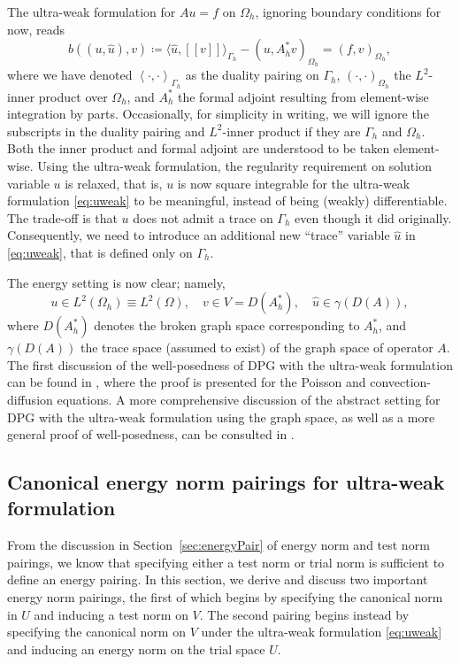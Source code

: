 \documentclass[11pt,onecolumn]{scrartcl}
\newcommand{\eqnlab}[1]{\label{eq:#1}}
\newcommand{\eqnref}[1]{\eqref{eq:#1}}
\newcommand{\secref}[1]{\ref{sec:#1}}
\newcommand{\LRp}[1]{\left( #1 \right)}
\newcommand{\LRs}[1]{\left[ #1 \right]}
\newcommand{\LRa}[1]{\left\langle #1 \right\rangle}
\newcommand{\jump}[1] {\ensuremath{\LRs{\![#1]\!}}}
\newcommand{\Gh}{\Gamma_h}
\newcommand{\Oh}{\Omega_h}
\begin{document}
The ultra-weak formulation for $Au = f$ on $\Oh$, ignoring boundary
conditions for now, reads
\begin{equation}
\eqnlab{uweak}
b\left(\left(u, \widehat{u}\right),v\right) \coloneqq \langle \widehat{u}, \jump{v}
\rangle_{\Gh} - (u,A_h^*v)_{\Oh}= \LRp{f,v}_{\Oh},
\end{equation}
where we have denoted $\LRa{\cdot,\cdot}_{\Gh}$ as the duality
pairing on $\Gh$, $\LRp{\cdot,\cdot}_{\Oh}$ the $L^2$-inner
product over $\Oh$, and $A_h^*$ the formal adjoint resulting from
element-wise integration by parts.  Occasionally, for simplicity in
writing, we will ignore the subscripts in the duality pairing and
$L^2$-inner product if they are $\Gh$ and $\Oh$. Both the
inner product and formal adjoint are understood to be taken
element-wise. Using the ultra-weak formulation, the regularity
requirement on solution variable $u$ is relaxed, that is, $u$ is now
square integrable for the ultra-weak formulation \eqnref{uweak} to be
meaningful, instead of being (weakly) differentiable.  The trade-off
is that $u$ does not admit a trace on $\Gh$ even though it did
originally. Consequently, we need to introduce an additional new
``trace'' variable $\widehat{u}$ in \eqnref{uweak}, that is defined only on
$\Gh$.

The energy setting is now clear; namely,
\[
u\in L^2\LRp{\Oh} \equiv L^2(\Omega), \quad v\in V=D(A^*_h), \quad
\widehat{u}\in \gamma(D(A)),
\]
where $D(A_h^*)$ denotes the broken graph space corresponding to $A_h^*$,
and $\gamma(D(A))$ the trace space (assumed to exist) of the graph space of
operator $A$. The first discussion of the well-posedness of DPG with the ultra-weak formulation can be found in \cite{analysisDPG}, where the proof is presented for the Poisson and convection-diffusion equations. A more comprehensive discussion of the abstract setting for DPG with the ultra-weak formulation using the graph space, as well as a more general proof of well-posedness, can be consulted in \cite{Bui-ThanhDemkowiczGhattas11b}. 

\subsection{Canonical energy norm pairings for ultra-weak formulation}

From the discussion in Section~\secref{energyPair} of energy norm and test norm pairings, we know that specifying either a test norm or trial norm is sufficient to define an energy pairing. In this section, we derive and discuss two important energy norm pairings, the first of which begins by specifying the canonical norm in $U$ and inducing a test norm on $V$. The second pairing begins instead by specifying the canonical norm on $V$ under the ultra-weak formulation \eqnref{uweak} and inducing an energy norm on the trial space $U$.
\end{document}
